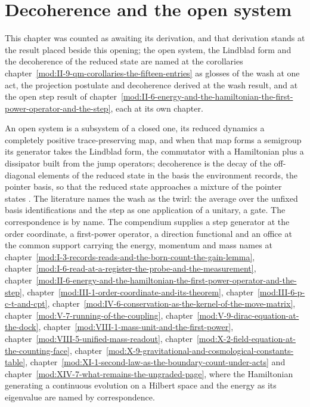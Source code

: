 \section{Decoherence and the open system}\label{mod:II-10-decoherence-and-the-open-system}
\begin{chtable}
This chapter was counted as awaiting its derivation, and that derivation stands at the result placed beside this opening; the open system, the Lindblad form and the decoherence of the reduced state are named at the corollaries chapter~\ref{mod:II-9-qm-corollaries-the-fifteen-entries} as glosses of the wash at one act, the projection postulate and decoherence derived at the wash result, and at the open step result of chapter~\ref{mod:II-6-energy-and-the-hamiltonian-the-first-power-operator-and-the-step}, each at its own chapter.
\end{chtable}
\chdeps{}{}
\begin{chbridge}An open system is a subsystem of a closed one, its reduced dynamics a completely positive trace-preserving map, and when that map forms a semigroup its generator takes the Lindblad form, the commutator with a Hamiltonian plus a dissipator built from the jump operators; decoherence is the decay of the off-diagonal elements of the reduced state in the basis the environment records, the pointer basis, so that the reduced state approaches a mixture of the pointer states \cite{Lindblad1976,Zurek2003}. The literature names the wash as the twirl: the average over the unfixed basis identifications and the step as one application of a unitary, a gate. The correspondence is by name. The compendium supplies a step generator at the order coordinate, a first-power operator, a direction functional and an office at the common support carrying the energy, momentum and mass names at chapter~\ref{mod:I-3-records-reads-and-the-born-count-the-gain-lemma}, chapter~\ref{mod:I-6-read-at-a-register-the-probe-and-the-measurement}, chapter~\ref{mod:II-6-energy-and-the-hamiltonian-the-first-power-operator-and-the-step}, chapter~\ref{mod:III-1-order-coordinate-and-its-theorem}, chapter~\ref{mod:III-6-p-c-t-and-cpt}, chapter~\ref{mod:IV-6-conservation-as-the-kernel-of-the-move-matrix}, chapter~\ref{mod:V-7-running-of-the-coupling}, chapter~\ref{mod:V-9-dirac-equation-at-the-dock}, chapter~\ref{mod:VIII-1-mass-unit-and-the-first-power}, chapter~\ref{mod:VIII-5-unified-mass-readout}, chapter~\ref{mod:X-2-field-equation-at-the-counting-face}, chapter~\ref{mod:X-9-gravitational-and-cosmological-constants-table}, chapter~\ref{mod:XI-1-second-law-as-the-boundary-count-under-acts} and chapter~\ref{mod:XIV-7-what-remains-the-ungraded-page}, where the Hamiltonian generating a continuous evolution on a Hilbert space and the energy as its eigenvalue are named by correspondence.\end{chbridge}
